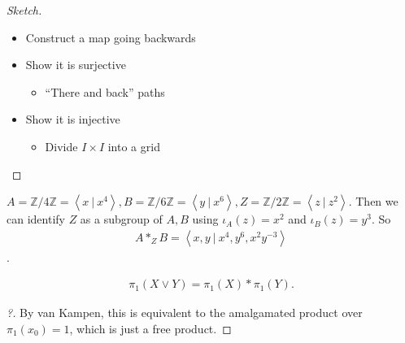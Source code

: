 \begin{proof}[Sketch]

\envlist

\begin{itemize}
\tightlist
\item
  Construct a map going backwards
\item
  Show it is surjective

  \begin{itemize}
  \tightlist
  \item
    ``There and back'' paths
  \end{itemize}
\item
  Show it is injective

  \begin{itemize}
  \tightlist
  \item
    Divide \(I\times I\) into a grid
  \end{itemize}
\end{itemize}

\end{proof}

\begin{example}

\(A = {\mathbb{Z}}/4{\mathbb{Z}}= \left\langle{x {~\mathrel{\Big|}~}x^4}\right\rangle, B = {\mathbb{Z}}/6{\mathbb{Z}}= \left\langle{y {~\mathrel{\Big|}~}x^6}\right\rangle, Z = {\mathbb{Z}}/2{\mathbb{Z}}= \left\langle{z {~\mathrel{\Big|}~}z^2}\right\rangle\).
Then we can identify \(Z\) as a subgroup of \(A, B\) using
\(\iota_{A}(z) = x^2\) and \(\iota_{B}(z) = y^3\). So
\begin{align*}A\ast_{Z} B = \left\langle{x, y {~\mathrel{\Big|}~}x^4, y^6, x^2y^{-3}}\right\rangle\end{align*}
.

\end{example}

\begin{proposition}[$\pi_1$ of a wedge]

\begin{align*}
\pi_1(X \vee Y) = \pi_1(X) \ast \pi_1(Y)
.\end{align*}

\end{proposition}

\begin{proof}[?]

By van Kampen, this is equivalent to the amalgamated product over
\(\pi_1(x_0) = 1\), which is just a free product.

\end{proof}

